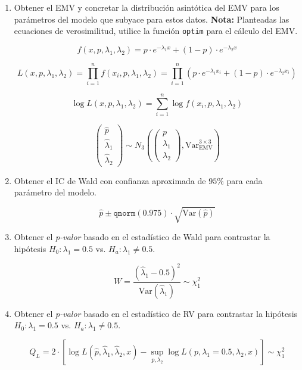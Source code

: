 \begin{enumerate}
    \item Obtener el EMV y concretar la distribución asintótica del EMV para los parámetros del modelo que subyace para estos datos.  
    \textbf{Nota:} Planteadas las ecuaciones de verosimilitud, utilice la función \texttt{optim} para el cálculo del EMV.

    \[
    f(x, p, \lambda_1, \lambda_2) = p \cdot e^{-\lambda_1 x} + (1-p) \cdot e^{-\lambda_2 x}
    \]

    \[
    L(x, p, \lambda_1, \lambda_2) = \prod_{i=1}^{n} f(x_i, p, \lambda_1, \lambda_2) = \prod_{i=1}^{n} \left( p \cdot e^{-\lambda_1 x_i} + (1-p) \cdot e^{-\lambda_2 x_i} \right)
    \]

    \[
    \log L(x, p, \lambda_1, \lambda_2) = \sum_{i=1}^{n} \log f(x_i, p, \lambda_1, \lambda_2)
    \]

    \[
    \begin{pmatrix}
        \hat{p} \\
        \hat{\lambda}_1 \\
        \hat{\lambda}_2
    \end{pmatrix}
    \sim
    N_3
    \left(
    \begin{pmatrix}
        p \\
        \lambda_1 \\
        \lambda_2
    \end{pmatrix},
    \text{Var}_{\text{EMV}}^{3 \times 3}
    \right)
    \]

    \item Obtener el IC de Wald con confianza aproximada de \(95\%\) para cada parámetro del modelo.

    \[
    \hat{p} \pm \texttt{qnorm}(0.975) \cdot \sqrt{\text{Var}(\hat{p})}
    \]

    \item Obtener el \textit{p-valor} basado en el estadístico de Wald para contrastar la hipótesis \(H_0: \lambda_1 = 0.5\) vs. \(H_a: \lambda_1 \neq 0.5\).

    \[
    W = \frac{(\hat{\lambda}_1 - 0.5)^2}{\text{Var}(\hat{\lambda}_1)} \sim \chi^2_1
    \]

    \item Obtener el \textit{p-valor} basado en el estadístico de RV para contrastar la hipótesis \(H_0: \lambda_1 = 0.5\) vs. \(H_a: \lambda_1 \neq 0.5\).

    \[
    Q_L = 2 \cdot \left[ \log L(\hat{p}, \hat{\lambda}_1, \hat{\lambda}_2, x) - \sup_{p, \lambda_2} \log L(p, \lambda_1 = 0.5, \lambda_2, x) \right] \sim \chi^2_1
    \]

\end{enumerate}

